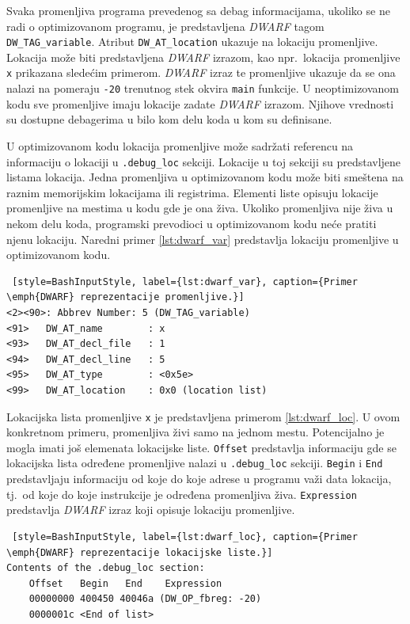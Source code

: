 \documentclass[12pt,oneside]{memoir}
\begin{document}
Svaka promenljiva programa prevedenog sa debag informacijama, ukoliko se ne radi o optimizovanom programu, je predstavljena \emph{DWARF} tagom \texttt{DW\_TAG\_variable}. Atribut \texttt{DW\_AT\_location} ukazuje na lokaciju promenljive. Lokacija može biti predstavljena \emph{DWARF} izrazom, kao npr.~lokacija promenljive \texttt{x} prikazana sledećim primerom. \emph{DWARF} izraz te promenljive ukazuje da se ona nalazi na pomeraju \texttt{-20} trenutnog stek okvira \texttt{main} funkcije. U neoptimizovanom kodu sve promenljive imaju lokacije zadate \emph{DWARF} izrazom. Njihove vrednosti su dostupne debagerima u bilo kom delu koda u kom su definisane.

U optimizovanom kodu lokacija promenljive može sadržati referencu na informaciju o lokaciji u \texttt{.debug\_loc} sekciji. Lokacije u toj sekciji su predstavljene listama lokacija. Jedna promenljiva u optimizovanom kodu može biti smeštena na raznim memorijskim lokacijama ili registrima. Elementi liste opisuju lokacije promenljive na mestima u kodu gde je ona živa. Ukoliko promenljiva nije živa u nekom delu koda, programski prevodioci u optimizovanom kodu neće pratiti njenu lokaciju. Naredni primer \ref{lst:dwarf_var} predstavlja lokaciju promenljive u optimizovanom kodu.

\begin{lstlisting} [style=BashInputStyle, label={lst:dwarf_var}, caption={Primer \emph{DWARF} reprezentacije promenljive.}]
<2><90>: Abbrev Number: 5 (DW_TAG_variable)
<91>   DW_AT_name        : x
<93>   DW_AT_decl_file   : 1
<94>   DW_AT_decl_line   : 5
<95>   DW_AT_type        : <0x5e>
<99>   DW_AT_location    : 0x0 (location list)
\end{lstlisting}

Lokacijska lista promenljive \texttt{x} je predstavljena primerom \ref{lst:dwarf_loc}. U ovom konkretnom primeru, promenljiva živi samo na jednom mestu. Potencijalno je mogla imati još elemenata lokacijske liste. \texttt{Offset} predstavlja informaciju gde se lokacijska lista određene promenljive nalazi u \texttt{.debug\_loc} sekciji. \texttt{Begin} i \texttt{End} predstavljaju informaciju od koje do koje adrese u programu važi data lokacija, tj.~od koje do koje instrukcije je određena promenljiva živa. \texttt{Expression} predstavlja \emph{DWARF} izraz koji opisuje lokaciju promenljive.

\begin{lstlisting} [style=BashInputStyle, label={lst:dwarf_loc}, caption={Primer \emph{DWARF} reprezentacije lokacijske liste.}]
Contents of the .debug_loc section:
	Offset   Begin   End    Expression
	00000000 400450 40046a (DW_OP_fbreg: -20)
	0000001c <End of list>
\end{lstlisting}
\end{document}
